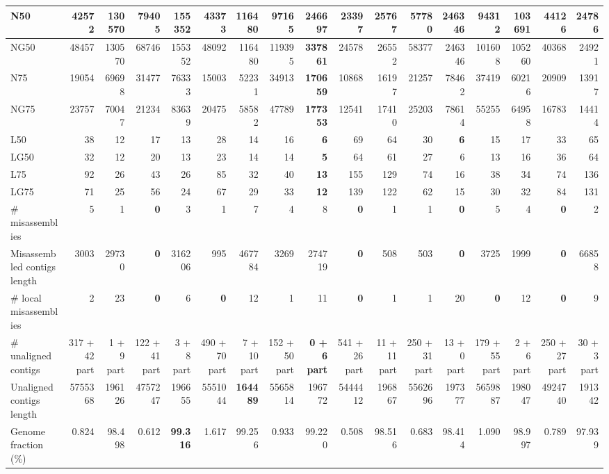 \documentclass[12pt,a4paper]{article}
\begin{document}
\begin{table}[ht]
\begin{center}
\begin{tabular}{|l*{16}{|r}|}
N50 & 42572 & 130570 & 79405 & 155352 & 43373 & 116480 & 97165 & {\bf 246697} & 23397 & 25767 & 57780 & 246346 & 94312 & 103691 & 44126 & 24786 \\ \hline
NG50 & 48457 & 130570 & 68746 & 155352 & 48092 & 116480 & 119395 & {\bf 337861} & 24578 & 26552 & 58377 & 246346 & 101608 & 105260 & 40368 & 24921 \\ \hline
N75 & 19054 & 69698 & 31477 & 76333 & 15003 & 52231 & 34913 & {\bf 170659} & 10868 & 16197 & 21257 & 78462 & 37419 & 60216 & 20909 & 13917 \\ \hline
NG75 & 23757 & 70047 & 21234 & 83639 & 20475 & 58582 & 47789 & {\bf 177353} & 12541 & 17410 & 25203 & 78614 & 55255 & 64958 & 16783 & 14414 \\ \hline
L50 & 38 & 12 & 17 & 13 & 28 & 14 & 16 & {\bf 6} & 69 & 64 & 30 & {\bf 6} & 15 & 17 & 33 & 65 \\ \hline
LG50 & 32 & 12 & 20 & 13 & 23 & 14 & 14 & {\bf 5} & 64 & 61 & 27 & 6 & 13 & 16 & 36 & 64 \\ \hline
L75 & 92 & 26 & 43 & 26 & 85 & 32 & 40 & {\bf 13} & 155 & 129 & 74 & 16 & 38 & 34 & 74 & 136 \\ \hline
LG75 & 71 & 25 & 56 & 24 & 67 & 29 & 33 & {\bf 12} & 139 & 122 & 62 & 15 & 30 & 32 & 84 & 131 \\ \hline
\# misassemblies & 5 & 1 & {\bf 0} & 3 & 1 & 7 & 4 & 8 & {\bf 0} & 1 & 1 & {\bf 0} & 5 & 4 & {\bf 0} & 2 \\ \hline
Misassembled contigs length & 3003 & 29730 & {\bf 0} & 316206 & 995 & 467784 & 3269 & 274719 & {\bf 0} & 508 & 503 & {\bf 0} & 3725 & 1999 & {\bf 0} & 66858 \\ \hline
\# local misassemblies & 2 & 23 & {\bf 0} & 6 & {\bf 0} & 12 & 1 & 11 & {\bf 0} & 1 & 1 & 20 & {\bf 0} & 12 & {\bf 0} & 9 \\ \hline
\# unaligned contigs & 317 + 42 part & 1 + 9 part & 122 + 41 part & 3 + 8 part & 490 + 70 part & 7 + 10 part & 152 + 50 part & {\bf 0 + 6 part} & 541 + 26 part & 11 + 11 part & 250 + 31 part & 13 + 0 part & 179 + 55 part & 2 + 6 part & 250 + 27 part & 30 + 3 part \\ \hline
Unaligned contigs length & 5755368 & 196126 & 4757247 & 196655 & 5551044 & {\bf 164489} & 5565814 & 196772 & 5444412 & 196867 & 5562696 & 197377 & 5659887 & 198047 & 4924740 & 191342 \\ \hline
Genome fraction (\%) & 0.824 & 98.498 & 0.612 & {\bf 99.316} & 1.617 & 99.256 & 0.933 & 99.220 & 0.508 & 98.516 & 0.683 & 98.414 & 1.090 & 98.997 & 0.789 & 97.939 \\ \hline

\end{tabular}
\end{center}
\end{table}
\end{document}
